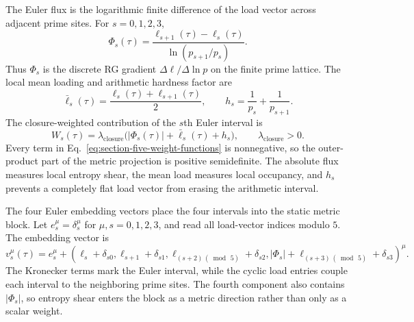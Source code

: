 \documentclass[11pt,letterpaper]{article}
\theoremstyle{plain}
\begin{document}
The Euler flux is the logarithmic finite difference of the load vector across
adjacent prime sites.  For $s=0,1,2,3$,
\begin{equation}
\label{eq:section-five-euler-flux}
 \Phi_s(\tau)
 =
 \frac{\ell_{s+1}(\tau)-\ell_s(\tau)}
 {\ln(p_{s+1}/p_s)}.
\end{equation}
Thus $\Phi_s$ is the discrete RG gradient
$\Delta\ell/\Delta\ln p$ on the finite prime lattice.  The local mean loading
and arithmetic hardness factor are
\begin{equation}
\label{eq:section-five-mean-loading-hardness}
 \bar\ell_s(\tau)
 =
 \frac{\ell_s(\tau)+\ell_{s+1}(\tau)}{2},
 \qquad
 h_s=\frac{1}{p_s}+\frac{1}{p_{s+1}}.
\end{equation}
The closure-weighted contribution of the $s$th Euler interval is
\begin{equation}
\label{eq:section-five-weight-functions}
 W_s(\tau)
 =
 \lambda_{\text{closure}}
 \bigl(|\Phi_s(\tau)|+\bar\ell_s(\tau)+h_s\bigr),
 \qquad
 \lambda_{\text{closure}}>0.
\end{equation}
Every term in Eq.~\eqref{eq:section-five-weight-functions} is nonnegative, so
the outer-product part of the metric projection is positive semidefinite.  The
absolute flux measures local entropy shear, the mean load measures local
occupancy, and $h_s$ prevents a completely flat load vector from erasing the
arithmetic interval.

The four Euler embedding vectors place the four intervals into the static
metric block.  Let $e_s^{\mu}=\delta_s^{\mu}$ for
$\mu,s=0,1,2,3$, and read all load-vector indices modulo $5$.  The embedding
vector is
\begin{equation}
\label{eq:section-five-execution-vectors}
 v_s^{\mu}(\tau)
 =
 e_s^{\mu}
 +
 \left(
 \ell_s+\delta_{s0},
 \ell_{s+1}+\delta_{s1},
 \ell_{(s+2)\,(\bmod\,5)}+\delta_{s2},
 |\Phi_s|+\ell_{(s+3)\,(\bmod\,5)}+\delta_{s3}
 \right)^{\mu}.
\end{equation}
The Kronecker terms mark the Euler interval, while the cyclic load entries
couple each interval to the neighboring prime sites.  The fourth component also
contains $|\Phi_s|$, so entropy shear enters the block as a metric direction
rather than only as a scalar weight.
\end{document}
